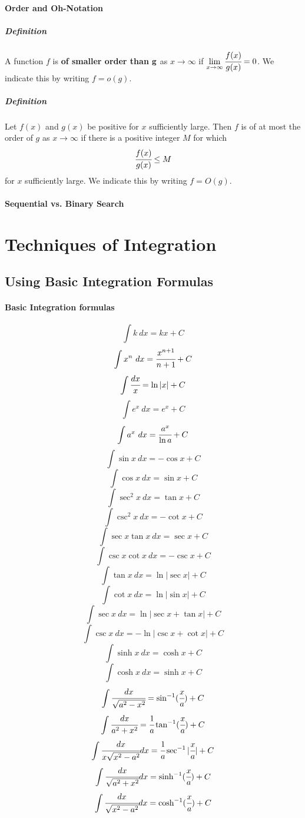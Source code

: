 \documentclass{article}
\begin{document}
            \paragraph{Order and Oh-Notation}
                \subparagraph{Definition}
            A function $f$ is \textbf{of smaller order than} $\bf{g}$ as $x\to \infty$ if $\lim\limits_{x\to \infty}\cfrac{f(x)}{g(x)}=0$. We indicate this by writing $f=o(g)$.
                \subparagraph{Definition} Let $f(x)$ and $g(x)$ be positive for $x$ sufficiently large. Then $f$ is of at most the order of $g$ as $x\to \infty$ if there is a positive integer $M$ for which
                \[\cfrac{f(x)}{g(x)}\le M\]
                for $x$ sufficiently large. We indicate this by writing $f=O(g)$.
            \paragraph{Sequential vs. Binary Search}

    \newpage
    \section{Techniques of Integration}
        \subsection{Using Basic Integration Formulas}
            \paragraph{Basic Integration formulas}
            \[\int k\ dx=kx +C\]
            \[\int x^n\ dx=\cfrac{x^{n+1}}{n+1} +C\]
            \[\int \cfrac{dx}{x}=\ln |x| +C\]
            \[\int e^x\ dx=e^x +C\]
            \[\int a^x\ dx=\cfrac{a^x}{\ln a} +C\]
            \[\int \sin x\ dx=-\cos x +C\]
            \[\int \cos x\ dx=\sin x +C\]
            \[\int \sec^2 x\ dx=\tan x +C\]
            \[\int \csc^2 x\ dx=-\cot x +C\]
            \[\int \sec x\tan x\ dx=\sec x +C\]
            \[\int \csc x\cot x\ dx=-\csc x +C\]
            \[\int \tan x\ dx=\ln |\sec x| +C\]
            \[\int \cot x\ dx=\ln |\sin x| +C\]
            \[\int \sec x\ dx=\ln |\sec x+\tan x| +C\]
            \[\int \csc x\ dx=-\ln |\csc x+\cot x| +C\]
            \[\int \sinh x\ dx=\cosh x +C\]
            \[\int \cosh x\ dx=\sinh x +C\]
            \[\int \cfrac{dx}{\sqrt{a^2-x^2}}=\sin^{-1}(\cfrac{x}{a}) +C\]
            \[\int \cfrac{dx}{a^2+x^2}=\cfrac{1}{a}\tan^{-1}(\cfrac{x}{a}) +C\]
            \[\int \cfrac{dx}{x\sqrt{x^2-a^2}}dx=\cfrac{1}{a}\sec^{-1}|\cfrac{x}{a}| +C\]
            \[\int \cfrac{dx}{\sqrt{a^2+x^2}}dx=\sinh^{-1}(\cfrac{x}{a}) +C\]
            \[\int \cfrac{dx}{\sqrt{x^2-a^2}}dx=\cosh^{-1}(\cfrac{x}{a}) +C\]
\end{document}
